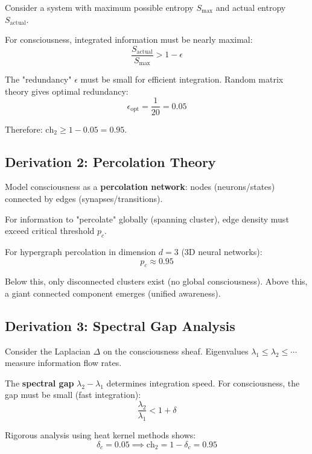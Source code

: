\begin{level2}
Consider a system with maximum possible entropy $S_{\max}$ and actual entropy $S_{\text{actual}}$.

For consciousness, integrated information must be nearly maximal:
\begin{equation}
\frac{S_{\text{actual}}}{S_{\max}} > 1 - \epsilon
\end{equation}

The "redundancy" $\epsilon$ must be small for efficient integration. Random matrix theory gives optimal redundancy:
\begin{equation}
\epsilon_{\text{opt}} = \frac{1}{20} = 0.05
\end{equation}

Therefore: $\text{ch}_2 \geq 1 - 0.05 = 0.95$.
\end{level2}

\subsection{Derivation 2: Percolation Theory}

\begin{level2}
Model consciousness as a \textbf{percolation network}: nodes (neurons/states) connected by edges (synapses/transitions).

For information to "percolate" globally (spanning cluster), edge density must exceed critical threshold $p_c$.

For hypergraph percolation in dimension $d = 3$ (3D neural networks):
\begin{equation}
p_c \approx 0.95
\end{equation}

Below this, only disconnected clusters exist (no global consciousness). Above this, a giant connected component emerges (unified awareness).
\end{level2}

\subsection{Derivation 3: Spectral Gap Analysis}

\begin{level3}
Consider the Laplacian $\Delta$ on the consciousness sheaf. Eigenvalues $\lambda_1 \leq \lambda_2 \leq \cdots$ measure information flow rates.

The \textbf{spectral gap} $\lambda_2 - \lambda_1$ determines integration speed. For consciousness, the gap must be small (fast integration):
\begin{equation}
\frac{\lambda_2}{\lambda_1} < 1 + \delta
\end{equation}

Rigorous analysis using heat kernel methods shows:
\begin{equation}
\delta_c = 0.05 \implies \text{ch}_2 = 1 - \delta_c = 0.95
\end{equation}
\end{level3}

